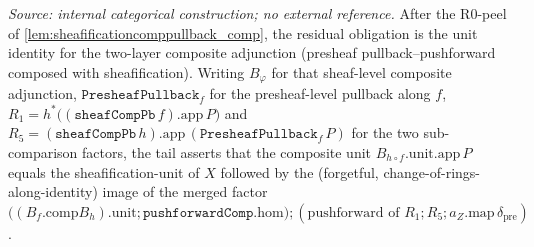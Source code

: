 \begin{lemma}
  \label{lem:sheafificationcomppullback_comp_tail}
  \textit{Source: internal categorical construction; no external reference.}
  After the R0-peel of \cref{lem:sheafificationcomppullback_comp}, the residual obligation is
  the unit identity for the two-layer composite adjunction (presheaf pullback--pushforward
  composed with sheafification). Writing \(B_\varphi\) for that sheaf-level composite
  adjunction, \(\mathtt{PresheafPullback}_f\) for the presheaf-level pullback along \(f\),
  \(R_1 = h^*\bigl((\mathtt{sheafCompPb}\,f).\mathrm{app}\,P\bigr)\) and
  \(R_5 = (\mathtt{sheafCompPb}\,h).\mathrm{app}\,(\mathtt{PresheafPullback}_f\,P)\) for the two
  sub-comparison factors, the tail asserts that the composite unit
  \(B_{h \circ f}.\mathrm{unit}.\mathrm{app}\,P\) equals the sheafification-unit of \(X\)
  followed by the (forgetful, change-of-rings-along-identity) image of the merged factor
  \(\bigl((B_f \mathbin{.\mathrm{comp}} B_h).\mathrm{unit} \mathbin{;}
  \mathtt{pushforwardComp}.\mathrm{hom}\bigr) \mathbin{;} (\text{pushforward of } R_1 \mathbin{;}
  R_5 \mathbin{;} a_Z.\mathrm{map}\,\delta_{\mathrm{pre}})\).
\end{lemma}
